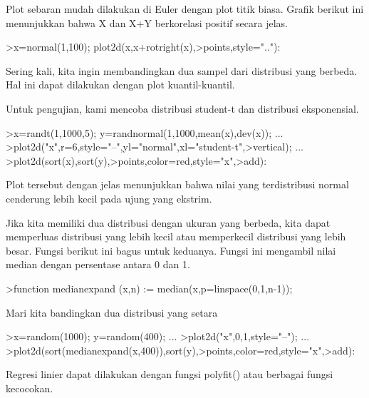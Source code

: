 \documentclass{article}
\begin{document}
\begin{eulernotebook}
\begin{eulercomment}
Plot sebaran mudah dilakukan di Euler dengan plot titik biasa. Grafik
berikut ini menunjukkan bahwa X dan X+Y berkorelasi positif secara
jelas.
\end{eulercomment}
\begin{eulerprompt}
>x=normal(1,100); plot2d(x,x+rotright(x),>points,style=".."):
\end{eulerprompt}
\begin{eulercomment}
Sering kali, kita ingin membandingkan dua sampel dari distribusi yang
berbeda. Hal ini dapat dilakukan dengan plot kuantil-kuantil.

Untuk pengujian, kami mencoba distribusi student-t dan distribusi
eksponensial.
\end{eulercomment}
\begin{eulerprompt}
>x=randt(1,1000,5); y=randnormal(1,1000,mean(x),dev(x)); ...
>plot2d("x",r=6,style="--",yl="normal",xl="student-t",>vertical); ...
>plot2d(sort(x),sort(y),>points,color=red,style="x",>add):
\end{eulerprompt}
\begin{eulercomment}
Plot tersebut dengan jelas menunjukkan bahwa nilai yang terdistribusi
normal cenderung lebih kecil pada ujung yang ekstrim.

Jika kita memiliki dua distribusi dengan ukuran yang berbeda, kita
dapat memperluas distribusi yang lebih kecil atau memperkecil
distribusi yang lebih besar. Fungsi berikut ini bagus untuk keduanya.
Fungsi ini mengambil nilai median dengan persentase antara 0 dan 1.
\end{eulercomment}
\begin{eulerprompt}
>function medianexpand (x,n) := median(x,p=linspace(0,1,n-1));
\end{eulerprompt}
\begin{eulercomment}
Mari kita bandingkan dua distribusi yang setara
\end{eulercomment}
\begin{eulerprompt}
>x=random(1000); y=random(400); ...
>plot2d("x",0,1,style="--"); ...
>plot2d(sort(medianexpand(x,400)),sort(y),>points,color=red,style="x",>add):
\end{eulerprompt}
\begin{eulercomment}
Regresi linier dapat dilakukan dengan fungsi polyfit() atau berbagai
fungsi kecocokan.


\end{eulercomment}
\end{eulernotebook}
\end{document}
